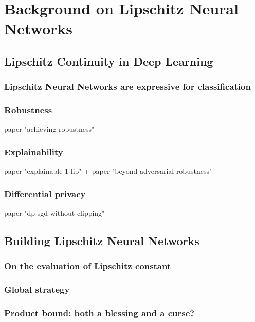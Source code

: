 \chapter{Background on Lipschitz Neural Networks}
\label{ch:background}

\section{Lipschitz Continuity in Deep Learning}

    \subsection{Lipschitz Neural Networks are expressive for classification}

    \subsection{Robustness}

    paper "achieving robustness"

    \subsection{Explainability}

    paper "explainable 1 lip" + paper "beyond adversarial robustness"

    \subsection{Differential privacy}

    paper "dp-sgd without clipping"

\section{Building Lipschitz Neural Networks}

    \subsection{On the evaluation of Lipschitz constant}

    \subsection{Global strategy}

    \subsection{Product bound: both a blessing and a curse?}


